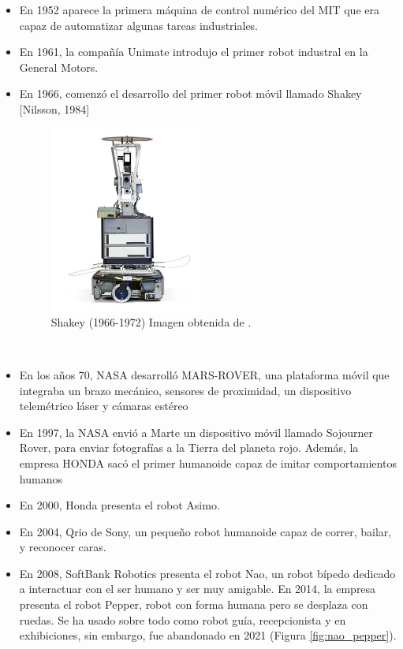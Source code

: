\begin {itemize}
	\item En 1952 aparece la primera máquina de control numérico del MIT que era capaz de automatizar algunas tareas industriales.
	\item En 1961, la compañía Unimate introdujo el primer robot industral en la General Motors.
	\item En 1966, comenzó el desarrollo del primer robot móvil llamado Shakey [Nilsson, 1984]
	\begin{figure} [H]
	\begin{center}
	\includegraphics[width=5cm]{imagenes/cap1/shakey.jpg}
	\end{center}
	\caption[Shakey (1966-1972)]{Shakey (1966-1972) Imagen obtenida de \cite{shakey-the-robot}.}
	\label{fig:shakey}
	\end{figure}\
	\item En los años 70, NASA desarrolló MARS-ROVER, una plataforma móvil que integraba un brazo mecánico, sensores de proximidad, un dispositivo telemétrico láser y cámaras estéreo
	\item En 1997, la NASA envió a Marte un dispositivo móvil llamado Sojourner Rover, para enviar fotografías a la Tierra del planeta rojo. Además, la empresa HONDA sacó el primer humanoide capaz de imitar comportamientos humanos
	\item En 2000, Honda presenta el robot Asimo.
	\item En 2004, Qrio de Sony, un pequeño robot humanoide capaz de correr, bailar, y reconocer caras.
	\item En 2008, SoftBank Robotics presenta el robot Nao, un robot bípedo dedicado a interactuar con el ser humano y ser muy amigable. En 2014, la empresa presenta el robot Pepper, robot con forma humana pero se desplaza con ruedas. Se ha usado sobre todo como robot guía, recepcionista y en exhibiciones, sin embargo, fue abandonado en 2021 (Figura \ref{fig:nao_pepper}).

\end{itemize}
